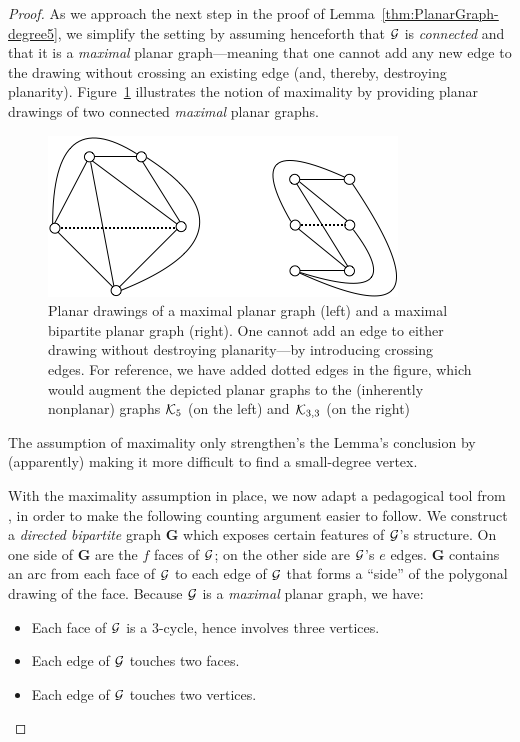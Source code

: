 \begin{proof}
As we approach the next step in the proof of Lemma~\ref{thm:PlanarGraph-degree5}, we  simplify the setting by assuming henceforth that $\mbox{$\cal G$}$ is {\em connected} and that it is a {\em maximal} planar graph---meaning that one cannot add any new edge to the drawing without crossing an existing edge (and, thereby, destroying planarity).  Figure~\ref{fig:K5andK3by3} illustrates the notion of maximality by providing planar drawings of two connected {\em maximal} planar graphs.
\begin{figure}[hbt]
\begin{center}
       \includegraphics[scale=0.55]{FiguresGraph/K5andK3by3}
\caption{Planar drawings of a maximal planar graph (left) and a maximal bipartite planar graph (right).  One cannot add an edge to either drawing without destroying planarity---by introducing crossing edges.  For reference, we have added dotted edges in the figure, which would augment the depicted planar graphs to the (inherently nonplanar) graphs $\mbox{$\cal K$}_5$ (on the left) and $\mbox{$\cal K$}_{3,3}$ (on the right)}
  \label{fig:K5andK3by3}
\end{center}
\end{figure}
The assumption of maximality only strengthen's the Lemma's conclusion by (apparently) making it more difficult to find a small-degree vertex.

\smallskip

With the maximality assumption in place, we now adapt a pedagogical tool from \cite{Berge73}, in order to make the following counting argument easier to follow.  We construct a {\em directed bipartite} graph {\bf G} which exposes certain features of $\mbox{$\cal G$}$'s structure.  On one side of {\bf G} are the $f$ faces of $\mbox{$\cal G$}$; on the other side are $\mbox{$\cal G$}$'s $e$ edges.  {\bf G} contains an arc from each face of $\mbox{$\cal G$}$ to each edge of $\mbox{$\cal G$}$ that forms a ``side'' of the polygonal drawing of the face.  Because $\mbox{$\cal G$}$ is a {\em maximal} planar graph, we have:
\begin{itemize}
\item
Each face of $\mbox{$\cal G$}$ is a $3$-cycle, hence involves three vertices.
\medskip\item
Each edge of $\mbox{$\cal G$}$ touches two faces.
\medskip\item
Each edge of $\mbox{$\cal G$}$ touches two vertices.
\end{itemize}


\end{proof}
